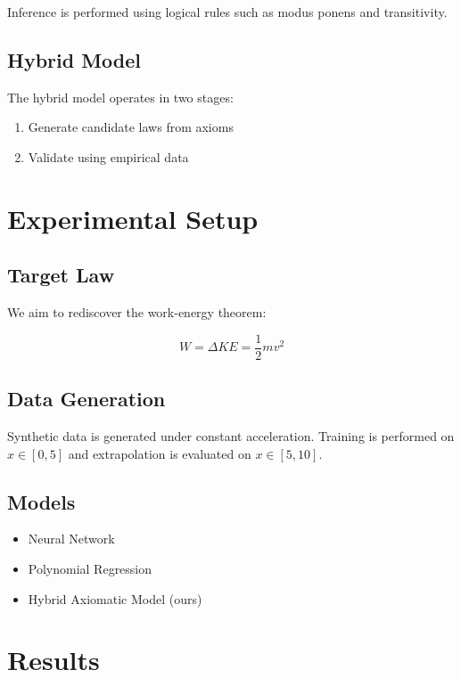 \documentclass[11pt]{article}
\begin{document}
Inference is performed using logical rules such as modus ponens and transitivity.

\subsection{Hybrid Model}

The hybrid model operates in two stages:

\begin{enumerate}
\item Generate candidate laws from axioms
\item Validate using empirical data
\end{enumerate}

\section{Experimental Setup}

\subsection{Target Law}

We aim to rediscover the work-energy theorem:

\begin{equation}
W = \Delta KE = \frac{1}{2} m v^2
\end{equation}

\subsection{Data Generation}

Synthetic data is generated under constant acceleration. Training is performed on $x \in [0,5]$ and extrapolation is evaluated on $x \in [5,10]$.

\subsection{Models}

\begin{itemize}
\item Neural Network
\item Polynomial Regression
\item Hybrid Axiomatic Model (ours)
\end{itemize}

\section{Results}
\end{document}
